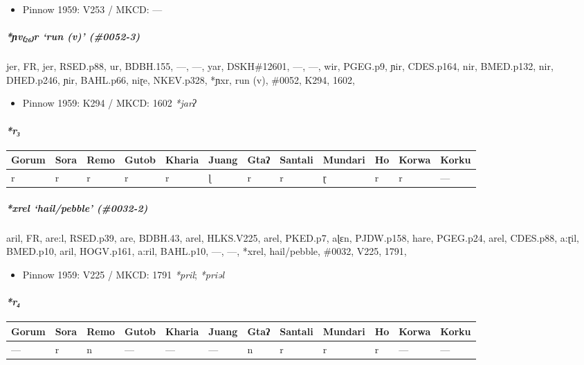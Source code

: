\documentclass[a4paper,]{article}
\providecommand{\tightlist}{%
  \setlength{\itemsep}{0pt}\setlength{\parskip}{0pt}}
\let\oldparagraph\paragraph
\renewcommand{\paragraph}[1]{\oldparagraph{#1}\mbox{}}
\let\oldsubparagraph\subparagraph
\renewcommand{\subparagraph}[1]{\oldsubparagraph{#1}\mbox{}}
\begin{document}
\begin{itemize}
\tightlist
\item
  Pinnow 1959: V253 / MKCD: ---
\end{itemize}

\subparagraph{\texorpdfstring{\emph{*ɲv₍₂₆₎r} `run (v)'
(\#0052-3)}{*ɲv₍₂₆₎r run (v) (\#0052-3)}}\label{ux272vr-run-v-0052-3}

jer, FR, jer, RSED.p88, ur, BDBH.155, ---, ---, yar, DSKH\#12601, ---,
---, wir, PGEG.p9, ɲir, CDES.p164, nir, BMED.p132, nir, DHED.p246, ɲir,
BAHL.p66, niɽe, NKEV.p328, *ɲxr, run (v), \#0052, K294, 1602,

\begin{itemize}
\tightlist
\item
  Pinnow 1959: K294 / MKCD: 1602 \emph{*jarʔ}
\end{itemize}

\paragraph{\texorpdfstring{\emph{*r₃}}{*r₃}}\label{r-2}

\begin{longtable}[]{@{}llllllllllll@{}}
\toprule
Gorum & Sora & Remo & Gutob & Kharia & Juang & Gtaʔ & Santali & Mundari
& Ho & Korwa & Korku\tabularnewline
\midrule
\endhead
r & r & r & r & r & ɭ & r & r & ɽ & r & r & ---\tabularnewline
\bottomrule
\end{longtable}

\subparagraph{\texorpdfstring{\emph{*xrel} `hail/pebble'
(\#0032-2)}{*xrel hail/pebble (\#0032-2)}}\label{xrel-hailpebble-0032-2}

aril, FR, are:l, RSED.p39, are, BDBH.43, arel, HLKS.V225, arel, PKED.p7,
aɭɛn, PJDW.p158, hare, PGEG.p24, arel, CDES.p88, a:ɽil, BMED.p10, aril,
HOGV.p161, a:ril, BAHL.p10, ---, ---, *xrel, hail/pebble, \#0032, V225,
1791,

\begin{itemize}
\tightlist
\item
  Pinnow 1959: V225 / MKCD: 1791 \emph{*pril}; \emph{*priəl}
\end{itemize}

\paragraph{\texorpdfstring{\emph{*r₄}}{*r₄}}\label{r-3}

\begin{longtable}[]{@{}llllllllllll@{}}
\toprule
Gorum & Sora & Remo & Gutob & Kharia & Juang & Gtaʔ & Santali & Mundari
& Ho & Korwa & Korku\tabularnewline
\midrule
\endhead
--- & r & n & --- & --- & --- & n & r & r & r & --- & ---\tabularnewline
\bottomrule
\end{longtable}
\end{document}
